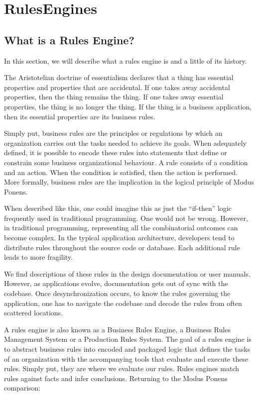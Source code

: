 \section{RulesEngines}

\subsection{What is a Rules Engine?}

In this section, we will describe what a rules engine is and a little of its history.

The Aristotelian doctrine of essentialism declares that a thing has essential properties and properties that are accidental.
If one takes away accidental properties, then the thing remains the thing.
If one takes away essential properties, the thing is no longer the thing.
If the thing is a business application, then its essential properties are its business rules.

Simply put, business rules are the principles or regulations by which an organization carries out the tasks needed to achieve its goals.
When adequately defined, it is possible to encode these rules into statements that define or constrain some business organizational behaviour.
A rule consists of a condition and an action.
When the condition is satisfied, then the action is performed.
More formally, business rules are the implication in the logical principle of Modus Ponens.

When described like this, one could imagine this as just the ``if-then'' logic frequently used in traditional programming.
One would not be wrong. 
However, in traditional programming, representing all the combinatorial outcomes can become complex.
In the typical application architecture, developers tend to distribute rules throughout the source code or database.
Each additional rule leads to more fragility.

We find descriptions of these rules in the design documentation or user manuals.
However, as applications evolve, documentation gets out of sync with the codebase.
Once desynchronization occurs, to know the rules governing the application, one has to navigate the codebase and decode the rules from often scattered locations.

A rules engine is also known as a Business Rules Engine, a Business Rules Management System or a Production Rules System.
The goal of a rules engine is to abstract business rules into encoded and packaged logic that defines the tasks of an organization with the accompanying tools that evaluate and execute these rules.
Simply put, they are where we evaluate our rules.
Rules engines match rules against facts and infer conclusions.
Returning to the Modus Ponens comparison:

